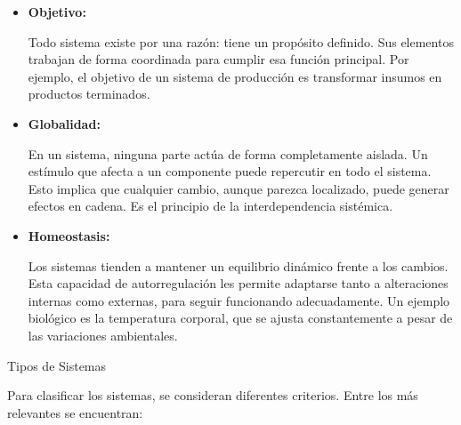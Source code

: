 \documentclass[a4paper,oneside,11pt]{article}
\begin{document}
    \begin{itemize}
        \item \textbf{Objetivo:}
    
        Todo sistema existe por una razón: tiene un propósito definido. Sus elementos trabajan de forma coordinada para cumplir esa función principal. Por ejemplo, el objetivo de un sistema de producción es transformar insumos en productos terminados.
        
        \item \textbf{Globalidad:}
    
        En un sistema, \colorbox{BurntOrange}{ninguna parte actúa de forma completamente aislada.} Un estímulo que afecta a un componente puede repercutir en todo el sistema. Esto implica que cualquier cambio, aunque parezca localizado, puede generar efectos en cadena. Es el principio de la interdependencia sistémica.
        
        \item \textbf{Homeostasis:}
    
        Los sistemas tienden a mantener un equilibrio dinámico frente a los cambios. Esta capacidad de autorregulación les permite adaptarse tanto a alteraciones internas como externas, para seguir funcionando adecuadamente. Un ejemplo biológico es la temperatura corporal, que se ajusta constantemente a pesar de las variaciones ambientales.
    \end{itemize}
    
    Tipos de Sistemas
    
    Para clasificar los sistemas, se consideran diferentes criterios. Entre los más relevantes se encuentran:
    
\end{document}

